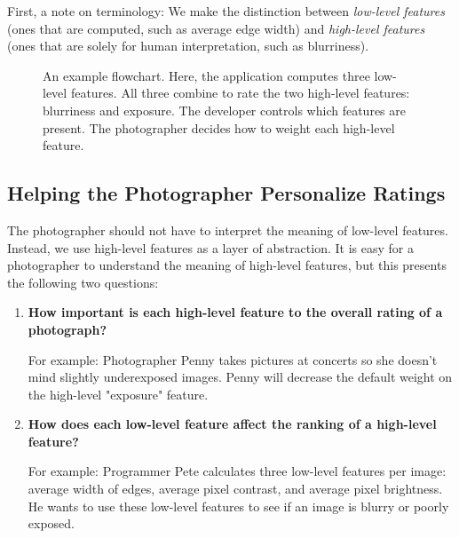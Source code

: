 \documentclass[11pt,letter]{article}
\begin{document}
First, a note on terminology: We make the distinction between \textit{low-level features} (ones that are computed, such as average edge width) and \textit{high-level features} (ones that are solely for human interpretation, such as blurriness).

\begin{figure*}[b!]
  \centering
  \caption{An example flowchart. Here, the application computes three low-level features. All three combine to rate the two high-level features: blurriness and exposure. The developer controls which features are present. The photographer decides how to weight each high-level feature.}
  \label{fig:flowchart}
\end{figure*}

\subsection{Helping the Photographer Personalize Ratings}
\label{abstraction}
The photographer should not have to interpret the meaning of low-level features. Instead, we use high-level features as a layer of abstraction. It is easy for a photographer to understand the meaning of high-level features, but this presents the following two questions:

\begin{enumerate}
\item \textbf{How important is each high-level feature to the overall rating of a photograph?}


For example: Photographer Penny takes pictures at concerts so she doesn't mind slightly underexposed images. Penny will decrease the default weight on the high-level "exposure" feature.

\item \textbf{How does each low-level feature affect the ranking of a high-level feature?}


For example: Programmer Pete calculates three low-level features per image: average width of edges, average pixel contrast, and average pixel brightness. He wants to use these low-level features to see if an image is blurry or poorly exposed.
\end{enumerate}
\end{document}
